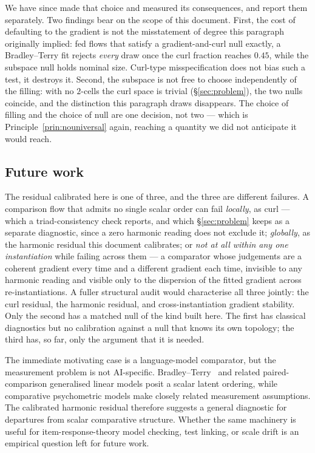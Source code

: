 \documentclass[11pt,a4paper]{article}
\begin{document}
We have since made that choice and measured its consequences, and report them
separately. Two findings bear on the scope of this document. First, the cost of
defaulting to the gradient is not the misstatement of degree this paragraph
originally implied: fed flows that satisfy a gradient-and-curl null exactly, a
Bradley--Terry fit rejects \emph{every} draw once the curl fraction reaches
$0.45$, while the subspace null holds nominal size. Curl-type misspecification
does not bias such a test, it destroys it. Second, the subspace is not free to
choose independently of the filling: with no $2$-cells the curl space is trivial
(\S\ref{sec:problem}), the two nulls coincide, and the distinction this
paragraph draws disappears. The choice of filling and the choice of null are one
decision, not two --- which is Principle~\ref{prin:nouniversal} again, reaching a
quantity we did not anticipate it would reach.

\subsection{Future work}

The residual calibrated here is one of three, and the three are different
failures. A comparison flow that admits no single scalar order can fail
\emph{locally}, as curl --- which a triad-consistency check reports, and which
\S\ref{sec:problem} keeps as a separate diagnostic, since a zero harmonic
reading does not exclude it; \emph{globally}, as the harmonic residual this
document calibrates; or \emph{not at all within any one instantiation} while
failing across them --- a comparator whose judgements are a coherent gradient
every time and a different gradient each time, invisible to any harmonic reading
and visible only to the dispersion of the fitted gradient across
re-instantiations. A fuller structural audit would characterise all three
jointly: the curl residual, the harmonic residual, and cross-instantiation
gradient stability. Only the second has a matched null of the kind built here.
The first has classical diagnostics but no calibration against a null that knows
its own topology; the third has, so far, only the argument that it is needed.

The immediate motivating case is a language-model comparator, but the measurement
problem is not AI-specific. Bradley--Terry~\cite{bradley1952} and related
paired-comparison generalised linear models posit a scalar latent ordering, while
comparative psychometric models make closely related measurement assumptions. The
calibrated harmonic residual therefore suggests a general diagnostic for
departures from scalar comparative structure. Whether the same machinery is
useful for item-response-theory model checking, test linking, or scale drift is
an empirical question left for future work.
\end{document}
